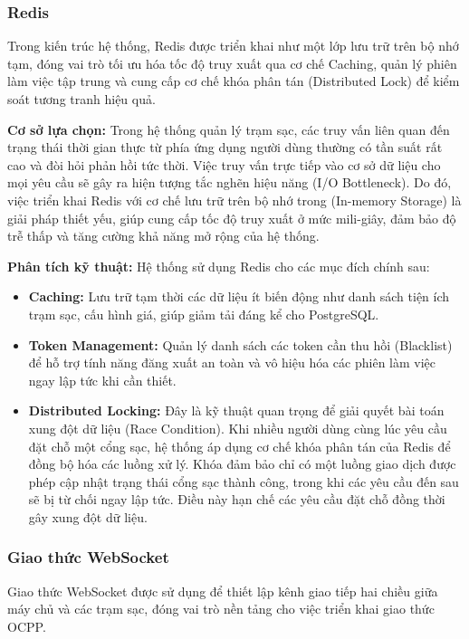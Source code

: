 \subsubsection{Redis}
Trong kiến trúc hệ thống, Redis \cite{redis_docs} được triển khai như một lớp lưu trữ trên bộ nhớ tạm, đóng vai trò tối ưu hóa tốc độ truy xuất qua cơ chế Caching, quản lý phiên làm việc tập trung và cung cấp cơ chế khóa phân tán (Distributed Lock) để kiểm soát tương tranh hiệu quả.

\textbf{Cơ sở lựa chọn:}
Trong hệ thống quản lý trạm sạc, các truy vấn liên quan đến trạng thái thời gian thực từ phía ứng dụng người dùng thường có tần suất rất cao và đòi hỏi phản hồi tức thời. Việc truy vấn trực tiếp vào cơ sở dữ liệu cho mọi yêu cầu sẽ gây ra hiện tượng tắc nghẽn hiệu năng (I/O Bottleneck). Do đó, việc triển khai Redis với cơ chế lưu trữ trên bộ nhớ trong (In-memory Storage) là giải pháp thiết yếu, giúp cung cấp tốc độ truy xuất ở mức mili-giây, đảm bảo độ trễ thấp và tăng cường khả năng mở rộng của hệ thống.

\textbf{Phân tích kỹ thuật:}
Hệ thống sử dụng Redis cho các mục đích chính sau:
\begin{itemize}
    \item \textbf{Caching:} Lưu trữ tạm thời các dữ liệu ít biến động như danh sách tiện ích trạm sạc, cấu hình giá, giúp giảm tải đáng kể cho PostgreSQL.
    \item \textbf{Token Management:} Quản lý danh sách các token cần thu hồi (Blacklist) để hỗ trợ tính năng đăng xuất an toàn và vô hiệu hóa các phiên làm việc ngay lập tức khi cần thiết.
    \item \textbf{Distributed Locking:} Đây là kỹ thuật quan trọng để giải quyết bài toán xung đột dữ liệu (Race Condition). Khi nhiều người dùng cùng lúc yêu cầu đặt chỗ một cổng sạc, hệ thống áp dụng cơ chế khóa phân tán của Redis để đồng bộ hóa các luồng xử lý. Khóa đảm bảo chỉ có một luồng giao dịch được phép cập nhật trạng thái cổng sạc thành công, trong khi các yêu cầu đến sau sẽ bị từ chối ngay lập tức. Điều này hạn chế các yêu cầu đặt chỗ đồng thời gây xung đột dữ liệu.
\end{itemize}

\subsubsection{Giao thức WebSocket}
Giao thức WebSocket \cite{mdn_websocket_client} được sử dụng để thiết lập kênh giao tiếp hai chiều giữa máy chủ và các trạm sạc, đóng vai trò nền tảng cho việc triển khai giao thức OCPP.

